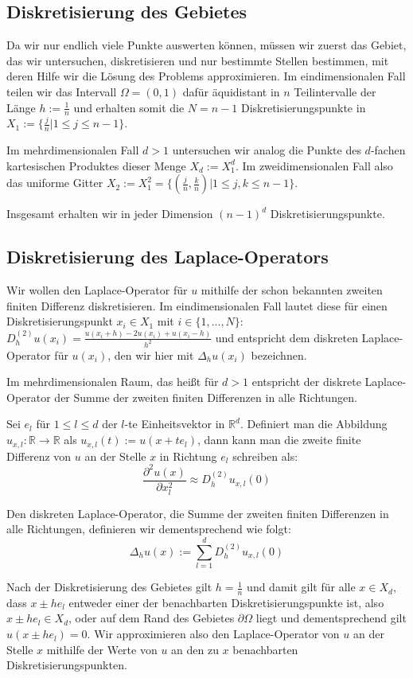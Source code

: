 \documentclass{scrartcl}
\newcommand{\R}{\mathbb{R}}
\begin{document}
\subsection{Diskretisierung des Gebietes}
Da wir nur endlich viele Punkte auswerten können, müssen wir zuerst das Gebiet, das wir untersuchen, diskretisieren und nur bestimmte Stellen bestimmen, mit deren Hilfe wir die Lösung des Problems approximieren.
Im eindimensionalen Fall teilen wir das Intervall $\Omega=(0,1)$ dafür äquidistant in $n$ Teilintervalle der Länge $h:=\frac{1}{n}$ und erhalten somit die $N=n-1$ Diskretisierungspunkte in
$X_1:=\{\frac{j}{n} | 1\leq j \leq n-1\}$.

Im mehrdimensionalen Fall $d>1$ untersuchen wir analog die Punkte des $d$-fachen kartesischen Produktes dieser Menge $X_d := X_1^d$. Im zweidimensionalen Fall also das uniforme Gitter $X_2 := X_1^2 = \{(\frac{j}{n}, \frac{k}{n}) | 1\leq j,k \leq n-1\}$.

Insgesamt erhalten wir in jeder Dimension $(n-1)^d$ Diskretisierungspunkte.

\subsection{Diskretisierung des Laplace-Operators}
Wir wollen den Laplace-Operator für $u$ mithilfe der schon bekannten zweiten finiten Differenz diskretisieren. Im eindimensionalen Fall lautet diese für einen Diskretisierungspunkt $x_i\in X_1$ mit $i \in \{1,...,N\}$:
$D_h^{(2)}u(x_i) = \frac{u(x_i+h) - 2u(x_i)+u(x_i-h)}{h^2}$ und entspricht dem diskreten Laplace-Operator für $u(x_i)$, den wir hier mit $\Delta_h u(x_i)$ bezeichnen.

Im mehrdimensionalen Raum, das heißt für $d>1$ entspricht der diskrete Laplace-Operator der Summe der zweiten finiten Differenzen in alle Richtungen.

Sei $e_l$ für $1\leq l \leq d$ der $l$-te Einheitsvektor in $\R^d$. Definiert man die Abbildung $u_{x,l}:\R\to\R$ als $u_{x,l}(t):=u(x+te_l)$, dann kann man die zweite finite Differenz von $u$ an der Stelle $x$ in Richtung $e_l$ schreiben als:
\[\frac{\partial^2 u(x)}{\partial x_l^2}\approx D_h^{(2)}u_{x,l}(0)\]

Den diskreten Laplace-Operator, die Summe der zweiten finiten Differenzen in alle Richtungen, definieren wir dementsprechend wie folgt:
\[\Delta_h u(x):= \sum_{l=1}^{d} D_h^{(2)}u_{x,l}(0)\]

Nach der Diskretisierung des Gebietes gilt $h=\frac{1}{n}$ und damit gilt für alle $x\in X_d$, dass $x\pm he_l$ entweder einer der benachbarten Diskretisierungspunkte ist, also $x\pm he_l\in X_d$, oder auf dem Rand des Gebietes $\partial\Omega$ liegt und dementsprechend gilt $u(x\pm he_l)=0$.
Wir approximieren also den Laplace-Operator von $u$ an der Stelle $x$ mithilfe der Werte von $u$ an den zu $x$ benachbarten Diskretisierungspunkten.
\end{document}
